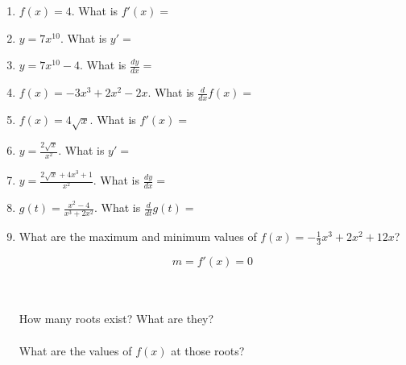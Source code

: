 \documentclass[14pt]{extarticle}
\begin{document}
\begin{enumerate}
	\item $f(x) =4$. What is $f'(x)=$
	\vspace{1cm}
	
	\item $y =7x^{10}$. What is $y'=$
	\vspace{1cm}
	
	\item $y =7x^{10}-4$. What is $\frac{dy}{dx}=$
	\vspace{1cm}
	
	\item $f(x) =-3x^3 + 2x^2 -2x$. What is $\frac{d}{dx}f(x)=$
	\vspace{1cm}
	
	\item $f(x) =4\sqrt{x}$. What is $f'(x)=$
	\vspace{1cm}
	
	\item $y =\frac{2\sqrt{x}}{x^2}$. What is $y'=$
	\vspace{1cm}
	
	\item $y =\frac{2\sqrt{x} + 4x^3+1}{x^2}$. What is $\frac{dy}{dx}=$
	\vspace{1cm}
	
	\item $g(t) =\frac{x^2-4}{x^3 +2x^2}$. What is $\frac{d}{dt}g(t)=$
	\vspace{1cm}
	
	\item What are the maximum and minimum values of  $f(x) =-\frac{1}{3}x^3 + 2x^2 +12x$?
	\begin{fleqn}\begin{equation*}m = f'(x) = 0\end{equation*} \end{fleqn}
	\vspace{1cm}
	\\\\
	How many roots exist? What are they?
	\vspace{1.5cm} \\\\
	What are the values of $f(x)$ at those roots?
\end{enumerate}


\cleardoublepage
\end{document}
